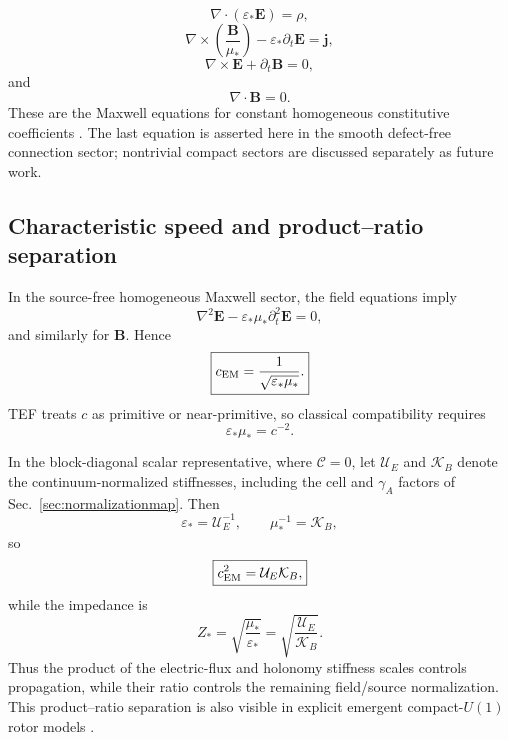 \documentclass[11pt]{article}
\begin{document}
\begin{equation}
\boxed{
\nabla\cdot(\varepsilon_*\mathbf E)=\rho,
}
\end{equation}
\begin{equation}
\boxed{
\nabla\times
\left(
\frac{\mathbf B}{\mu_*}
\right)
-
\varepsilon_*\partial_t\mathbf E
=
\mathbf j,
}
\end{equation}
\begin{equation}
\boxed{
\nabla\times\mathbf E+\partial_t\mathbf B=0,
}
\end{equation}
and
\begin{equation}
\boxed{
\nabla\cdot\mathbf B=0.
}
\end{equation}
These are the Maxwell equations for constant homogeneous constitutive coefficients \cite{jackson1999}. The last equation is asserted here in the smooth defect-free connection sector; nontrivial compact sectors are discussed separately as future work.

\subsection{Characteristic speed and product--ratio separation}

In the source-free homogeneous Maxwell sector, the field equations imply
\begin{equation}
\nabla^2\mathbf E
-
\varepsilon_*\mu_*\partial_t^2\mathbf E
=0,
\end{equation}
and similarly for $\mathbf B$. Hence
\begin{equation}
\boxed{
c_{\rm EM}
=
\frac{1}{\sqrt{\varepsilon_*\mu_*}}.
}
\end{equation}
TEF treats $c$ as primitive or near-primitive, so classical compatibility requires
\begin{equation}
\boxed{
\varepsilon_*\mu_*=c^{-2}.
}
\end{equation}

In the block-diagonal scalar representative, where $\mathcal C=0$, let $\mathcal U_E$ and $\mathcal K_B$ denote the continuum-normalized stiffnesses, including the cell and $\gamma_A$ factors of Sec.~\ref{sec:normalizationmap}. Then
\begin{equation}
\varepsilon_*=\mathcal U_E^{-1},
\qquad
\mu_*^{-1}=\mathcal K_B,
\end{equation}
so
\begin{equation}
\boxed{
c_{\rm EM}^2
=
\mathcal U_E\mathcal K_B,
}
\end{equation}
while the impedance is
\begin{equation}
\boxed{
Z_*
=
\sqrt{\frac{\mu_*}{\varepsilon_*}}
=
\sqrt{\frac{\mathcal U_E}{\mathcal K_B}}.
}
\end{equation}
Thus the product of the electric-flux and holonomy stiffness scales controls propagation, while their ratio controls the remaining field/source normalization. This product--ratio separation is also visible in explicit emergent compact-$U(1)$ rotor models \cite{levinwen2006}.
\end{document}
